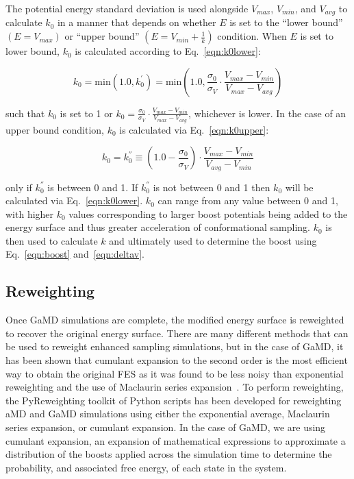 \documentclass[9pt,tutorial,pubversion]{livecoms}
\begin{document}
The potential energy standard deviation is used alongside $V_{max}$, $V_{min}$, and $V_{avg}$ to calculate $k_{0}$ in a manner that depends on whether $E$ is set to the ``lower bound'' $\left(E=V_{max}\right)$ or  ``upper bound'' $\left(E=V_{min}+\frac{1}{k}\right)$ condition. When $E$ is set to lower bound, $k_0$ is calculated according to Eq.~\ref{eqn:k0lower}:

\begin{equation}
    k_{0} = \text{min}\left(1.0,k_{0}^{'}\right) = \text{min} \left (1.0, \frac{\sigma_{0}}{\sigma_{V}} \cdot \frac{V_{max} - {V_{min}}}{V_{max} - V_{avg}} \right) 
    \label{eqn:k0lower}
\end{equation}

such that $k_{0}$ is set to 1 or $k_{0} = \frac{\sigma_{0}}{\sigma_{V}} \cdot \frac{V_{max} - {V_{min}}}{V_{max} - V_{avg}}$, whichever is lower. In the case of an upper bound condition, $k_{0}$ is calculated via Eq.~\ref{eqn:k0upper}:

\begin{equation}
    k_{0} = k_{0}^{''} \equiv \left (1.0 - \frac{\sigma_{0}}{\sigma_{V}} \right) \cdot \frac{V_{max} - {V_{min}}}{V_{avg} - V_{min}}
    \label{eqn:k0upper}
\end{equation}

only if $k_{0}^{''}$ is between 0 and 1. If $k_{0}^{''}$ is not between 0 and 1 then $k_{0}$ will be calculated via Eq.~\ref{eqn:k0lower}. $k_{0}$ can range from any value between 0 and 1, with higher $k_{0}$ values corresponding to larger boost potentials being added to the energy surface and thus greater acceleration of conformational sampling. $k_{0}$ is then used to calculate $k$ and ultimately used to determine the boost using Eq.~\ref{eqn:boost} and~\ref{eqn:deltav}.

\bigskip
\subsection{Reweighting}
\label{ss:reweighting}
Once GaMD simulations are complete, the modified energy surface is reweighted to recover the original energy surface. There are many different methods that can be used to reweight enhanced sampling simulations, but in the case of GaMD, it has been shown that cumulant expansion to the second order is the most efficient way to obtain the original FES as it was found to be less noisy than exponential reweighting and the use of Maclaurin series expansion~\cite{miao_improved_2014}. To perform reweighting, the PyReweighting toolkit of Python scripts has been developed for reweighting aMD and GaMD simulations using either the exponential average, Maclaurin series expansion, or cumulant expansion. In the case of GaMD, we are using cumulant expansion, an expansion of mathematical expressions to approximate a distribution of the boosts applied across the simulation time to determine the probability, and associated free energy, of each state in the system. 
\end{document}

